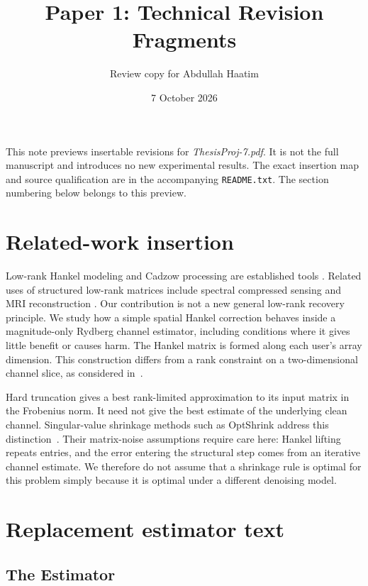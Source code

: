 \documentclass[11pt,a4paper]{article}
\title{Paper 1: Technical Revision Fragments}
\author{Review copy for Abdullah Haatim}
\date{7 October 2026}
\begin{document}
\maketitle
\noindent This note previews insertable revisions for \textit{ThesisProj-7.pdf}.
It is not the full manuscript and introduces no new experimental results.
The exact insertion map and source qualification are in the accompanying
\texttt{README.txt}. The section numbering below belongs to this preview.
\section{Related-work insertion}


Low-rank Hankel modeling and Cadzow processing are established tools
\cite{cadzow1988,markovsky2008}. Related uses of structured low-rank
matrices include spectral compressed sensing and MRI reconstruction
\cite{chen2014emac,jin2016aloha,haldar2014loraks}. Our contribution is not
a new general low-rank recovery principle. We study how a simple spatial
Hankel correction behaves inside a magnitude-only Rydberg channel
estimator, including conditions where it gives little benefit or causes
harm. The Hankel matrix is formed along each user's array dimension.
This construction differs from a rank constraint on a two-dimensional
channel slice, as considered in~\cite{xu2025}.

Hard truncation gives a best rank-limited approximation to its input
matrix in the Frobenius norm. It need not give the best estimate of the
underlying clean channel. Singular-value shrinkage methods such as
OptShrink address this distinction~\cite{nadakuditi2014optshrink}. Their
matrix-noise assumptions require care here: Hankel lifting repeats
entries, and the error entering the structural step comes from an
iterative channel estimate. We therefore do not assume that a shrinkage
rule is optimal for this problem simply because it is optimal under a
different denoising model.


\section{Replacement estimator text}

\subsection{The Estimator}
\label{sec:revised-estimator}
\end{document}
